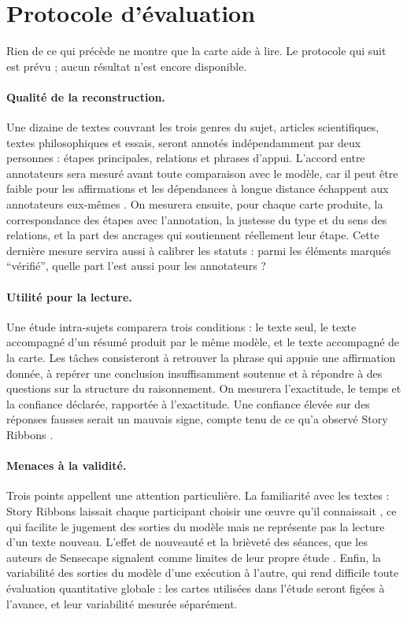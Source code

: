 \section{Protocole d’évaluation}
\label{sec:evaluation}

Rien de ce qui précède ne montre que la carte aide à lire. Le protocole qui suit est prévu ; aucun résultat n’est encore disponible.

\paragraph{Qualité de la reconstruction.}
Une dizaine de textes couvrant les trois genres du sujet, articles scientifiques, textes philosophiques et essais, seront annotés indépendamment par deux personnes : étapes principales, relations et phrases d’appui. L’accord entre annotateurs sera mesuré avant toute comparaison avec le modèle, car il peut être faible pour les affirmations \parencite[631]{ref07} et les dépendances à longue distance échappent aux annotateurs eux-mêmes \parencite[43]{ref08}. On mesurera ensuite, pour chaque carte produite, la correspondance des étapes avec l’annotation, la justesse du type et du sens des relations, et la part des ancrages qui soutiennent réellement leur étape. Cette dernière mesure servira aussi à calibrer les statuts : parmi les éléments marqués \enquote{vérifié}, quelle part l’est aussi pour les annotateurs ?

\paragraph{Utilité pour la lecture.}
Une étude intra-sujets comparera trois conditions : le texte seul, le texte accompagné d’un résumé produit par le même modèle, et le texte accompagné de la carte. Les tâches consisteront à retrouver la phrase qui appuie une affirmation donnée, à repérer une conclusion insuffisamment soutenue et à répondre à des questions sur la structure du raisonnement. On mesurera l’exactitude, le temps et la confiance déclarée, rapportée à l’exactitude. Une confiance élevée sur des réponses fausses serait un mauvais signe, compte tenu de ce qu’a observé Story Ribbons \parencite[8]{ref01}.

\paragraph{Menaces à la validité.}
Trois points appellent une attention particulière. La familiarité avec les textes : Story Ribbons laissait chaque participant choisir une œuvre qu’il connaissait \parencite[7]{ref01}, ce qui facilite le jugement des sorties du modèle mais ne représente pas la lecture d’un texte nouveau. L’effet de nouveauté et la brièveté des séances, que les auteurs de Sensecape signalent comme limites de leur propre étude \parencite[13]{ref03}. Enfin, la variabilité des sorties du modèle d’une exécution à l’autre, qui rend difficile toute évaluation quantitative globale \parencite[17]{ref04} : les cartes utilisées dans l’étude seront figées à l’avance, et leur variabilité mesurée séparément.
